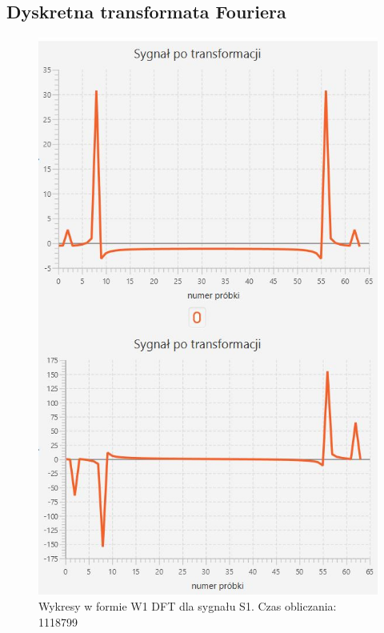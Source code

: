 \documentclass[12pt]{article}
\begin{document}
\subsection {Dyskretna transformata Fouriera}
\begin{figure}[H]
	\centering
	\includegraphics[width=.8\linewidth]{DFT-S1-W1}
	\caption{Wykresy w formie W1 DFT dla sygnału S1. Czas obliczania: 1118799}
	\label{S1_sygnal}
\end{figure}
\end{document}

